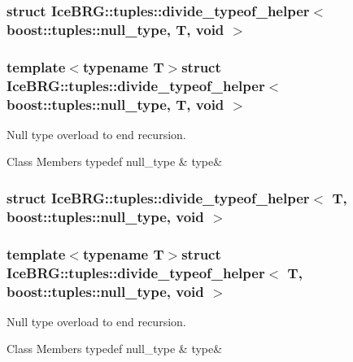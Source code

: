 \subsubsection{struct Ice\+B\+R\+G\+:\+:tuples\+:\+:divide\+\_\+typeof\+\_\+helper$<$ boost\+:\+:tuples\+:\+:null\+\_\+type, T, void $>$}
\subsubsection*{template$<$typename T$>$struct Ice\+B\+R\+G\+::tuples\+::divide\+\_\+typeof\+\_\+helper$<$ boost\+::tuples\+::null\+\_\+type, T, void $>$}

Null type overload to end recursion. \begin{DoxyFields}{Class Members}
\hypertarget{namespaceIceBRG_1_1tuples_a7cfc445edc292d533aa157bb68adeca7}{}typedef null\+\_\+type\label{namespaceIceBRG_1_1tuples_a7cfc445edc292d533aa157bb68adeca7}
&
type&
\\
\hline

\end{DoxyFields}
\label{structIceBRG_1_1tuples_1_1divide__typeof__helper_3_01T_00_01boost_1_1tuples_1_1null__type_00_01void_01_4}
\hypertarget{namespaceIceBRG_1_1tuples_structIceBRG_1_1tuples_1_1divide__typeof__helper_3_01T_00_01boost_1_1tuples_1_1null__type_00_01void_01_4}{}
\subsubsection{struct Ice\+B\+R\+G\+:\+:tuples\+:\+:divide\+\_\+typeof\+\_\+helper$<$ T, boost\+:\+:tuples\+:\+:null\+\_\+type, void $>$}
\subsubsection*{template$<$typename T$>$struct Ice\+B\+R\+G\+::tuples\+::divide\+\_\+typeof\+\_\+helper$<$ T, boost\+::tuples\+::null\+\_\+type, void $>$}

Null type overload to end recursion. \begin{DoxyFields}{Class Members}
\hypertarget{namespaceIceBRG_1_1tuples_aff0ca5b155cb513918ee25d96b94a9a8}{}typedef null\+\_\+type\label{namespaceIceBRG_1_1tuples_aff0ca5b155cb513918ee25d96b94a9a8}
&
type&
\\
\hline

\end{DoxyFields}
\label{structIceBRG_1_1tuples_1_1divide__typeof__helper_3_01T1_00_01T2_00_01BRG__S__IS__TUPLE_07T1_08_00_01BRG__S__IS__TUPLE_07T2_08_4}
\hypertarget{namespaceIceBRG_1_1tuples_structIceBRG_1_1tuples_1_1divide__typeof__helper_3_01T1_00_01T2_00_01BRG__S__IS__TUPLE_07T1_08_00_01BRG__S__IS__TUPLE_07T2_08_4}{}
